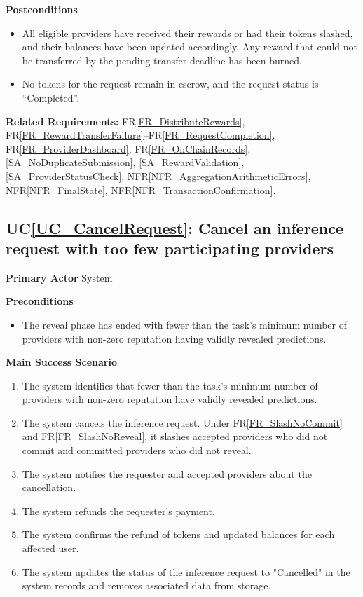 \documentclass[12pt]{article}
\newcounter{ucnum} %
\newcommand{\ucref}[1]{UC\ref{#1}}
\newcommand{\rref}[1]{FR\ref{#1}}
\newcommand{\nfrref}[1]{NFR\ref{#1}}
\begin{document}
\textbf{Postconditions}
\begin{itemize}
\item All eligible providers have received their rewards or had their tokens slashed, and their balances have been updated accordingly. Any reward that could not be transferred by the pending transfer deadline has been burned.
\item No tokens for the request remain in escrow, and the request status is ``Completed''.
\end{itemize}

\textbf{Related Requirements:} \rref{FR_DistributeRewards}, \rref{FR_RewardTransferFailure}--\rref{FR_RequestCompletion}, \rref{FR_ProviderDashboard}, \rref{FR_OnChainRecords}, \ref{SA_NoDuplicateSubmission}, \ref{SA_RewardValidation}, \ref{SA_ProviderStatusCheck}, \nfrref{NFR_AggregationArithmeticErrors}, \nfrref{NFR_FinalState}, \nfrref{NFR_TransactionConfirmation}.

 \label{UC_CancelRequest}
\subsection{\ucref{UC_CancelRequest}: Cancel an inference request with too few participating providers}

\textbf{Primary Actor}
System

\textbf{Preconditions}
\begin{itemize}
\item The reveal phase has ended with fewer than the task's minimum number of providers with non-zero reputation having validly revealed predictions.
\end{itemize}

\textbf{Main Success Scenario}
\begin{enumerate}
\item The system identifies that fewer than the task's minimum number of providers with non-zero reputation have validly revealed predictions.
\item The system cancels the inference request. Under \rref{FR_SlashNoCommit} and \rref{FR_SlashNoReveal}, it slashes accepted providers who did not commit and committed providers who did not reveal.
\item The system notifies the requester and accepted providers about the cancellation.
\item The system refunds the requester's payment.
\item The system confirms the refund of tokens and updated balances for each affected user.
\item The system updates the status of the inference request to "Cancelled" in the system records and removes associated data from storage.
\end{enumerate}
\end{document}
